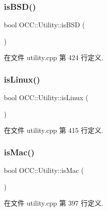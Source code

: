\mbox{\label{namespace_o_c_c_1_1_utility_a663aa43ebb0a38ddc1c814ce7644d0d1}} 
\subsubsection{\texorpdfstring{is\+B\+S\+D()}{isBSD()}}
{\footnotesize\ttfamily bool O\+C\+C\+::\+Utility\+::is\+B\+SD (\begin{DoxyParamCaption}{ }\end{DoxyParamCaption})}



在文件 utility.\+cpp 第 424 行定义.

\mbox{\label{namespace_o_c_c_1_1_utility_afc1774f88e908263fa577879b7cb1587}} 
\subsubsection{\texorpdfstring{is\+Linux()}{isLinux()}}
{\footnotesize\ttfamily bool O\+C\+C\+::\+Utility\+::is\+Linux (\begin{DoxyParamCaption}{ }\end{DoxyParamCaption})}



在文件 utility.\+cpp 第 415 行定义.

\mbox{\label{namespace_o_c_c_1_1_utility_aa51a4651f7e6560f028061f65aeb694b}} 
\subsubsection{\texorpdfstring{is\+Mac()}{isMac()}}
{\footnotesize\ttfamily bool O\+C\+C\+::\+Utility\+::is\+Mac (\begin{DoxyParamCaption}{ }\end{DoxyParamCaption})}



在文件 utility.\+cpp 第 397 行定义.

